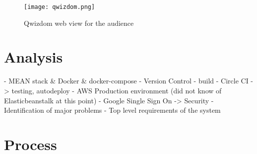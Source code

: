 \begin{figure}[ht]
    \centering
    \texttt{[image: qwizdom.png]}
    \caption{Qwizdom web view for the audience}
    \label{fig:qwizdom}
\end{figure}

\section{Analysis}
%
%
%
- MEAN stack \& Docker \& docker-compose
- Version Control
- build - Circle CI -> testing, autodeploy
- AWS Production environment (did not know of Elasticbeanstalk at this point)
- Google Single Sign On -> Security
- Identification of major problems
- Top level requirements of the system


\section{Process}
